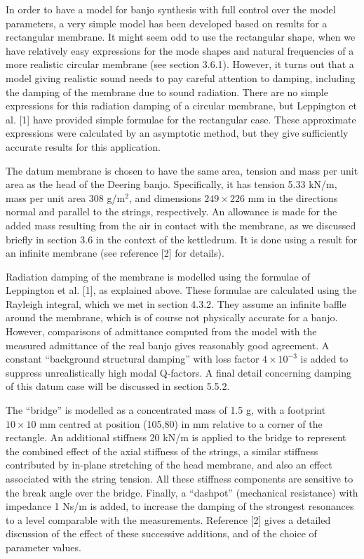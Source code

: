   In order to have a model for banjo synthesis with full control over the model 
  parameters, a very simple model has been developed based on results for a 
  rectangular membrane. It might seem odd to use the rectangular shape, when we 
  have relatively easy expressions for the mode shapes and natural frequencies 
  of a more realistic circular membrane (see section 3.6.1). However, it turns 
  out that a model giving realistic sound needs to pay careful attention to 
  damping, including the damping of the membrane due to sound radiation. There 
  are no simple expressions for this radiation damping of a circular membrane, 
  but Leppington et al. [1] have provided simple formulae for the rectangular 
  case. These approximate expressions were calculated by an asymptotic method, 
  but they give sufficiently accurate results for this application. 

  The datum membrane is chosen to have the same area, tension and mass per unit 
  area as the head of the Deering banjo. Specifically, it has tension 5.33 
  kN/m, mass per unit area 308 g/m$^2$, and dimensions $249 \times 226$ mm in 
  the directions normal and parallel to the strings, respectively. An allowance 
  is made for the added mass resulting from the air in contact with the 
  membrane, as we discussed briefly in section 3.6 in the context of the 
  kettledrum. It is done using a result for an infinite membrane (see reference 
  [2] for details). 

  Radiation damping of the membrane is modelled using the formulae of 
  Leppington et al. [1], as explained above. These formulae are calculated 
  using the Rayleigh integral, which we met in section 4.3.2. They assume an 
  infinite baffle around the membrane, which is of course not physically 
  accurate for a banjo. However, comparisons of admittance computed from the 
  model with the measured admittance of the real banjo gives reasonably good 
  agreement. A constant ``background structural damping'' with loss factor $4 
  \times 10^{-3}$ is added to suppress unrealistically high modal Q-factors. A 
  final detail concerning damping of this datum case will be discussed in 
  section 5.5.2. 

  The ``bridge'' is modelled as a concentrated mass of 1.5 g, with a footprint 
  $10 \times 10$ mm centred at position (105,80) in mm relative to a corner of 
  the rectangle. An additional stiffness 20 kN/m is applied to the bridge to 
  represent the combined effect of the axial stiffness of the strings, a 
  similar stiffness contributed by in-plane stretching of the head membrane, 
  and also an effect associated with the string tension. All these stiffness 
  components are sensitive to the break angle over the bridge. Finally, a 
  ``dashpot'' (mechanical resistance) with impedance 1 Ns/m is added, to 
  increase the damping of the strongest resonances to a level comparable with 
  the measurements. Reference [2] gives a detailed discussion of the effect of 
  these successive additions, and of the choice of parameter values. 

